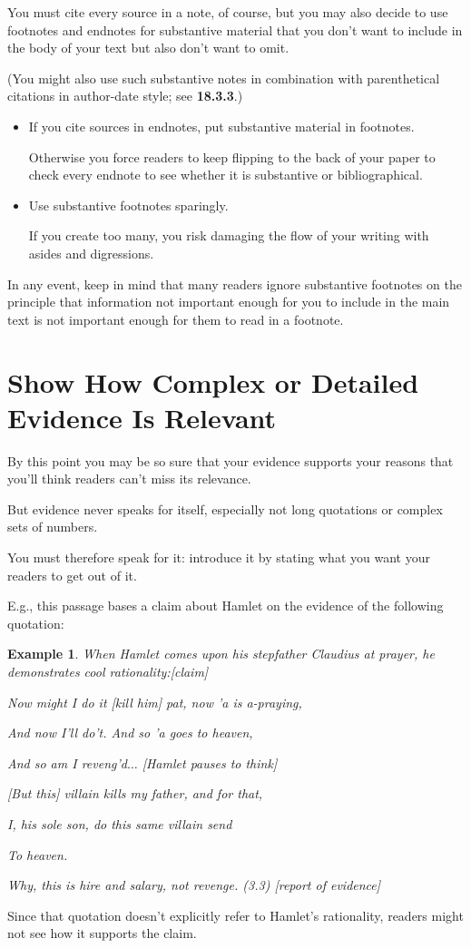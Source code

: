 \documentclass[oneside]{book}
\numberwithin{equation}{section}
\newtheorem{example}{Example}[section]
\begin{document}
You must cite every source in a note, of course, but you may also decide to use footnotes and endnotes for substantive material that you don't want to include in the body of your text but also don't want to omit.

(You might also use such substantive notes in combination with parenthetical citations in author-date style; see \textbf{18.3.3}.)
\begin{itemize}
    \item If you cite sources in endnotes, put substantive material in footnotes.
    
    Otherwise you force readers to keep flipping to the back of your paper to check every endnote to see whether it is substantive or bibliographical.
    \item Use substantive footnotes sparingly.
    
    If you create too many, you risk damaging the flow of your writing with asides and digressions.
\end{itemize}
In any event, keep in mind that many readers ignore substantive footnotes on the principle that information not important enough for you to include in the main text is not important enough for them to read in a footnote.

\section{Show How Complex or Detailed Evidence Is Relevant}
By this point you may be so sure that your evidence supports your reasons that you'll think readers can't miss its relevance.

But evidence never speaks for itself, especially not long quotations or complex sets of numbers.

You must therefore speak for it: introduce it by stating what you want your readers to get out of it.

E.g., this passage bases a claim about Hamlet on the evidence of the following quotation:
\begin{example}
    When Hamlet comes upon his stepfather Claudius at prayer, he demonstrates cool rationality:\emph{[claim]}
    
    Now might I do it [kill him] pat, now 'a is a-praying,
    
    And now I'll do't. And so 'a goes to heaven,
    
    And so am I reveng'd$\ldots$ [Hamlet pauses to think]
    
    [But this] villain kills my father, and for that,
    
    I, his sole son, do this same villain send
    
    To heaven.
    
    Why, this is hire and salary, not revenge. (3.3) \emph{[report of evidence]}
\end{example}
Since that quotation doesn't explicitly refer to Hamlet's rationality, readers might not see how it supports the claim.
\end{document}
